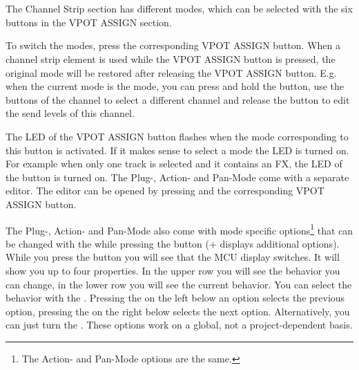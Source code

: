 \section{\csms}\label{csmodes}

The Channel Strip section has different modes, which can be
selected with the six buttons in the VPOT ASSIGN section.

To switch the modes, press the corresponding VPOT ASSIGN button. When
a channel strip element is used while the VPOT ASSIGN button is
pressed, the original mode will be restored after releasing the VPOT
ASSIGN button. E.g. when the current mode is the \send mode, you can
press and hold the \pan button, use the \select buttons of the channel
to select a different channel and release the \pan button to edit the
send levels of this channel.

The LED of the VPOT ASSIGN button flashes when the mode corresponding
to this button is activated. If it makes sense to select a mode the LED
is turned on. For example when only one track is selected and it contains an
FX, the LED of the \plug button is turned on. The Plug-, Action- and
Pan-Mode come with a separate editor. The editor can be opened by pressing
\alt and the corresponding VPOT ASSIGN button.

The Plug-, Action- and Pan-Mode also come with mode specific
options\footnote{The Action- and Pan-Mode options are the same.} that
can be changed with the \vpots while pressing the \option button
(\shift + \option displays additional options).  While you press the
\option button you will see that the MCU display switches. It will
show you up to four properties. In the upper row you will see the
behavior you can change, in the lower row you will see the current
behavior. You can select the behavior with the \vpots. Pressing the
\vpot on the left below an option selects the previous option,
pressing the \vpot on the right below selects the next
option. Alternatively, you can just turn the \vpots. These options
work on a global, not a project-dependent basis.

